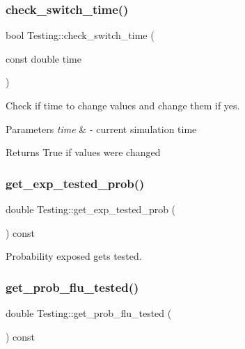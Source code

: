 \subsubsection{\texorpdfstring{check\+\_\+switch\+\_\+time()}{check\_switch\_time()}}
{\footnotesize\ttfamily bool Testing\+::check\+\_\+switch\+\_\+time (\begin{DoxyParamCaption}\item[{const double}]{time }\end{DoxyParamCaption})}



Check if time to change values and change them if yes. 


\begin{DoxyParams}{Parameters}
{\em time} & -\/ current simulation time \\
\hline
\end{DoxyParams}
\begin{DoxyReturn}{Returns}
True if values were changed 
\end{DoxyReturn}
\mbox{\label{classTesting_aa46e6228c0ab63baea9a9453c79fa5f9}} 
\subsubsection{\texorpdfstring{get\+\_\+exp\+\_\+tested\+\_\+prob()}{get\_exp\_tested\_prob()}}
{\footnotesize\ttfamily double Testing\+::get\+\_\+exp\+\_\+tested\+\_\+prob (\begin{DoxyParamCaption}{ }\end{DoxyParamCaption}) const\hspace{0.3cm}{\ttfamily [inline]}}



Probability exposed gets tested. 

\mbox{\label{classTesting_a0d44f5f729d3725422a748155454a062}} 
\subsubsection{\texorpdfstring{get\+\_\+prob\+\_\+flu\+\_\+tested()}{get\_prob\_flu\_tested()}}
{\footnotesize\ttfamily double Testing\+::get\+\_\+prob\+\_\+flu\+\_\+tested (\begin{DoxyParamCaption}{ }\end{DoxyParamCaption}) const\hspace{0.3cm}{\ttfamily [inline]}}



